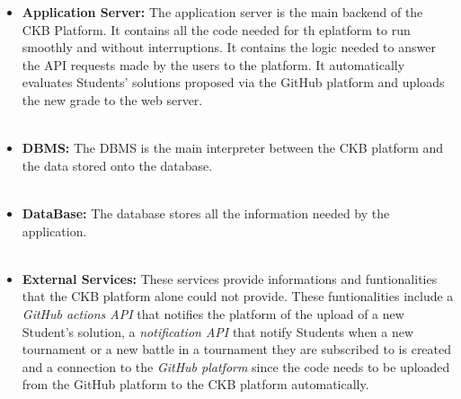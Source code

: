 \documentclass{article}
\begin{document}
{\begin{itemize}
by the platform. \\ \\
\item \textbf{Application Server:} The application server is the main backend of the CKB Platform. It contains all the code needed for th eplatform to run
smoothly and without interruptions. It contains the logic needed to answer the API requests made by the users to the platform. It
automatically evaluates Students' solutions proposed via the GitHub platform and uploads the new grade to the web server. \\ \\
\item \textbf{DBMS:} The DBMS is the main interpreter between the CKB platform and the data stored onto the database. \\ \\
\item \textbf{DataBase:} The database stores all the information needed by the application. \\ \\
\item \textbf{External Services:} These services provide informations and funtionalities that the CKB platform alone could not provide.
These funtionalities include a \textit{GitHub actions API} that notifies the platform of the upload of a new Student's solution, a \textit{notification API}
that notify Students when a new tournament or a new battle in a tournament they are subscribed to is created and a connection to the \textit{GitHub platform}
since the code needs to be uploaded from the GitHub platform to the CKB platform automatically. \\
\end{itemize}
}
\end{document}

